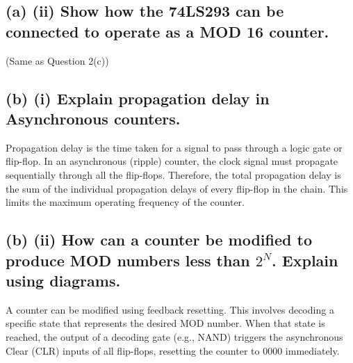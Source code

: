 \documentclass[11pt,a4paper]{article}
\begin{document}
\subsection*{(a) (ii) Show how the 74LS293 can be connected to operate as a MOD 16 counter.}
(Same as Question 2(c))

\subsection*{(b) (i) Explain propagation delay in Asynchronous counters.}
Propagation delay is the time taken for a signal to pass through a logic gate or flip-flop. In an asynchronous (ripple) counter, the clock signal must propagate sequentially through all the flip-flops. Therefore, the total propagation delay is the sum of the individual propagation delays of every flip-flop in the chain. This limits the maximum operating frequency of the counter.

\subsection*{(b) (ii) How can a counter be modified to produce MOD numbers less than $2^N$. Explain using diagrams.}
A counter can be modified using feedback resetting. This involves decoding a specific state that represents the desired MOD number. When that state is reached, the output of a decoding gate (e.g., NAND) triggers the asynchronous Clear (CLR) inputs of all flip-flops, resetting the counter to 0000 immediately.

\begin{center}
\end{center}
\end{document}
